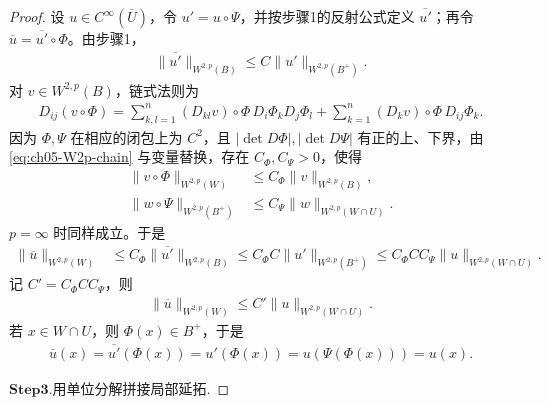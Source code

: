 \documentclass[../../main.tex]{subfiles}%
\begin{document}
\begin{proof}
设 $u\in C^{\infty}(\overline U)$，令 $u'=u\circ\Psi$，并按步骤1的反射公式定义 $\overline{u'}$；再令 $\overline u=\overline{u'}\circ\Phi$。由步骤1，
\begin{align*}
\|\overline{u'}\|_{W^{2,p}(B)}
\leqslant C\|u'\|_{W^{2,p}(B^{+})}.
\end{align*}
对 $v\in W^{2,p}(B)$，链式法则为
\begin{align}
D_{ij}(v\circ\Phi)
=\sum_{k,l=1}^{n}(D_{kl}v)\circ\Phi\,D_i\Phi_kD_j\Phi_l
+\sum_{k=1}^{n}(D_kv)\circ\Phi\,D_{ij}\Phi_k.
\label{eq:ch05-W2p-chain}
\end{align}
因为 $\Phi,\Psi$ 在相应的闭包上为 $C^{2}$，且 $|\det D\Phi|,|\det D\Psi|$ 有正的上、下界，由 \eqref{eq:ch05-W2p-chain} 与变量替换，存在 $C_{\Phi},C_{\Psi}>0$，使得
\begin{align*}
\|v\circ\Phi\|_{W^{2,p}(W)}
&\leqslant C_{\Phi}\|v\|_{W^{2,p}(B)},\\
\|w\circ\Psi\|_{W^{2,p}(B^{+})}
&\leqslant C_{\Psi}\|w\|_{W^{2,p}(W\cap U)}.
\end{align*}
$p=\infty$ 时同样成立。于是
\begin{align*}
\|\overline u\|_{W^{2,p}(W)}
&\leqslant C_{\Phi}\|\overline{u'}\|_{W^{2,p}(B)}
\leqslant C_{\Phi}C\|u'\|_{W^{2,p}(B^{+})}
\leqslant C_{\Phi}CC_{\Psi}\|u\|_{W^{2,p}(W\cap U)}.
\end{align*}
记 $C'=C_{\Phi}CC_{\Psi}$，则
\begin{align}
\|\overline u\|_{W^{2,p}(W)}
\leqslant C'\|u\|_{W^{2,p}(W\cap U)}.
\label{eq:ch05-W2p-local-estimate}
\end{align}
若 $x\in W\cap U$，则 $\Phi(x)\in B^{+}$，于是
\begin{align*}
\overline u(x)=\overline{u'}(\Phi(x))=u'(\Phi(x))=u(\Psi(\Phi(x)))=u(x).
\end{align*}

\noindent$\mathbf{Step}\bm{3}$.{\heiti 用单位分解拼接局部延拓.}


\end{proof}
\end{document}
